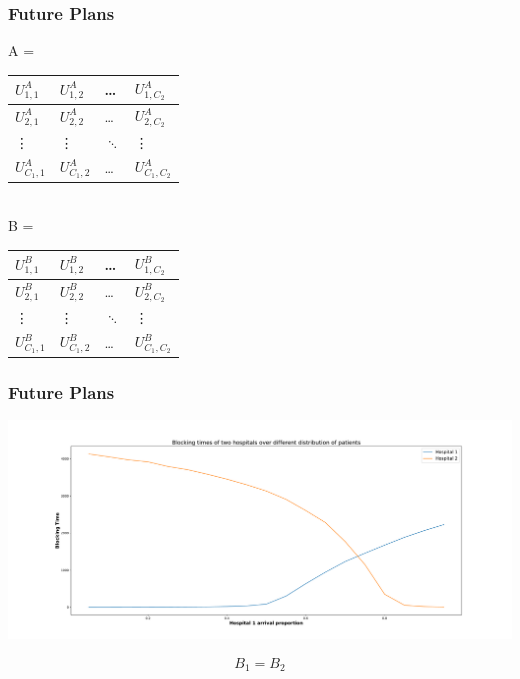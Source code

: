 \begin{frame}
    \frametitle{Future Plans}
    
    \begin{table}[h]
        \centering
        A = 
        \begin{tabular}{|l|l|l|l|}
            \hline
            \( U_{1,1}^A \) & \( U_{1,2}^A \) & \dots & \( U_{1,C_2}^A \) \\ \hline
            \( U_{2,1}^A \) & \( U_{2,2}^A \) & \dots & \( U_{2,C_2}^A \) \\ \hline
            \vdots & \vdots & \( \ddots \) & \vdots \\ \hline
            \( U_{C_1,1}^A \) & \( U_{C_1,2}^A \) & \dots & \( U_{C_1,C_2}^A \) \\ \hline
        \end{tabular}\\
        \vspace{1cm}
        B = 
        \begin{tabular}{|l|l|l|l|}
            \hline
            \( U_{1,1}^B \) & \( U_{1,2}^B \) & \dots & \( U_{1,C_2}^B \) \\ \hline
            \( U_{2,1}^B \) & \( U_{2,2}^B \) & \dots & \( U_{2,C_2}^B \) \\ \hline
            \vdots & \vdots & \( \ddots \) & \vdots \\ \hline
            \( U_{C_1,1}^B \) & \( U_{C_1,2}^B \) & \dots & \( U_{C_1,C_2}^B \) \\ \hline
        \end{tabular}
    \end{table}  

    
\end{frame}


\begin{frame}
    \frametitle{Future Plans}
    
    \centering
    \includegraphics[trim=140 40 150 50, clip, width=\textwidth]{Bin/src/optimal_patient.pdf}

    \begin{equation*}
        B_1 = B_2
    \end{equation*}
\end{frame}


